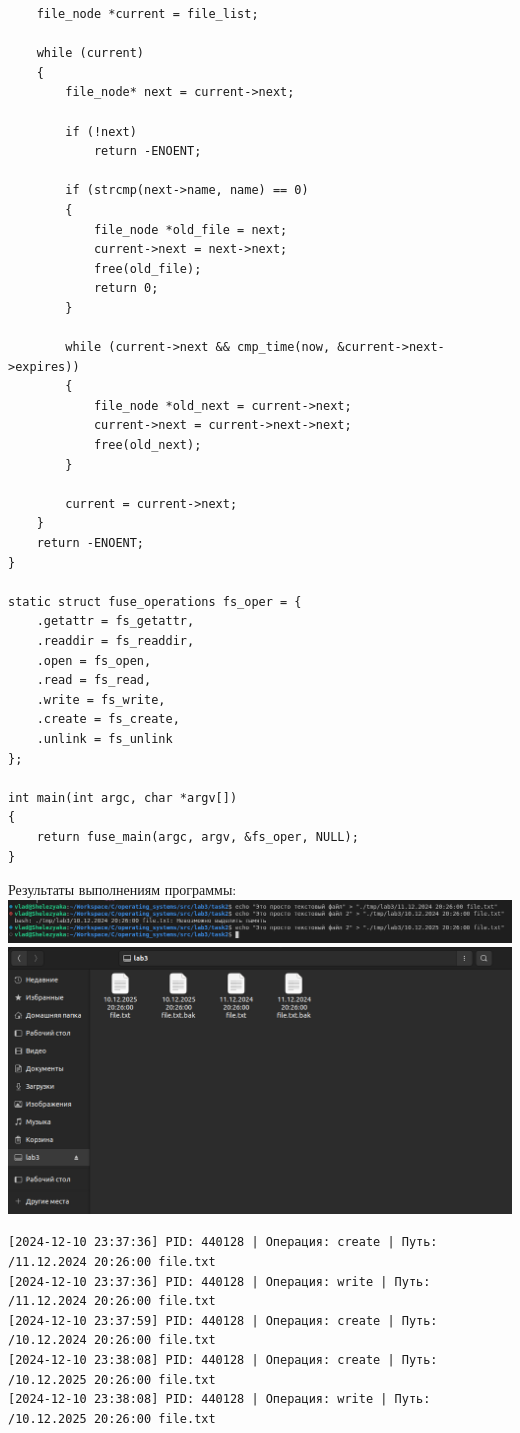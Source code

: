 \documentclass[a4paper,14pt]{extarticle}
\begin{document}
\begin{verbatim}
    file_node *current = file_list;

    while (current)
    {
        file_node* next = current->next;

        if (!next)
            return -ENOENT;

        if (strcmp(next->name, name) == 0)
        {
            file_node *old_file = next;
            current->next = next->next;
            free(old_file);
            return 0;
        }

        while (current->next && cmp_time(now, &current->next->expires))
        {
            file_node *old_next = current->next;
            current->next = current->next->next;
            free(old_next);
        }

        current = current->next;
    }
    return -ENOENT;
}

static struct fuse_operations fs_oper = {
    .getattr = fs_getattr,
    .readdir = fs_readdir,
    .open = fs_open,
    .read = fs_read,
    .write = fs_write,
    .create = fs_create,
    .unlink = fs_unlink
};

int main(int argc, char *argv[])
{
    return fuse_main(argc, argv, &fs_oper, NULL);
}
\end{verbatim}

Результаты выполнениям программы:\\
\includegraphics[width=140mm]{task3_a.png}\\
\includegraphics[width=140mm]{task3_b.png}\\
\begin{verbatim}
[2024-12-10 23:37:36] PID: 440128 | Операция: create | Путь: /11.12.2024 20:26:00 file.txt
[2024-12-10 23:37:36] PID: 440128 | Операция: write | Путь: /11.12.2024 20:26:00 file.txt
[2024-12-10 23:37:59] PID: 440128 | Операция: create | Путь: /10.12.2024 20:26:00 file.txt
[2024-12-10 23:38:08] PID: 440128 | Операция: create | Путь: /10.12.2025 20:26:00 file.txt
[2024-12-10 23:38:08] PID: 440128 | Операция: write | Путь: /10.12.2025 20:26:00 file.txt
\end{verbatim}
\end{document}
